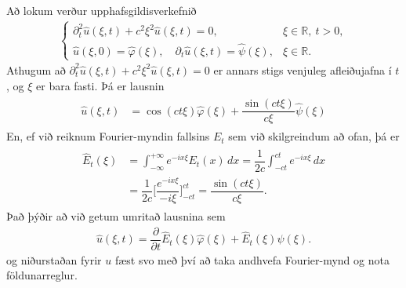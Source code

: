 \documentclass[a4paper,10pt,icelandic]{sphinxmanual}
\begin{document}
Að lokum verður upphafsgildisverkefnið
\begin{equation*}
\begin{split}\begin{cases}
{\partial}_t^2\widehat u({\xi},t)+c^2{\xi}^2
\widehat u({\xi},t)=0, &{\xi}\in {{\mathbb  R}},\ t>0,\\
\widehat u({\xi},0)=\widehat\varphi({\xi}), \quad {\partial}_t\widehat
u({\xi},t)=\widehat{\psi}({\xi}), &{\xi}\in {{\mathbb  R}}.
\end{cases}\end{split}
\end{equation*}
Athugum að \({\partial}_t^2\widehat u({\xi},t)+c^2{\xi}^2\widehat u({\xi},t)=0\) er annars stigs venjuleg afleiðujafna í \(t\), og \(\xi\) er bara fasti. Þá er lausnin
\begin{equation*}
\begin{split}\begin{aligned}
\widehat u({\xi},t)&=
\cos(ct{\xi})\widehat\varphi({\xi})
+\dfrac{\sin(ct{\xi})}{c{\xi}}\widehat{\psi}({\xi})
\end{aligned}\end{split}
\end{equation*}
En, ef við reiknum Fourier-myndin fallsins \(E_t\) sem við skilgreindum að ofan, þá er
\begin{equation*}
\begin{split}\begin{aligned}
\widehat E_t(\xi)&=\int_{-\infty}^{+\infty}e^{-ix\xi}E_t(x)\, dx
=\dfrac 1{2c}\int_{-ct}^{ct}e^{-ix\xi}\, dx\\
 &=\dfrac 1{2c}\bigg[\dfrac{e^{-ix\xi}}{-i\xi}\bigg]_{-ct}^{ct}
=\dfrac{\sin(ct\xi)}{c\xi}.\end{aligned}\end{split}
\end{equation*}
Það þýðir að við getum umritað lausnina sem
\begin{equation*}
\begin{split}\widehat u({\xi},t)=\dfrac{\partial}{\partial t}\widehat E_t({\xi})\widehat\varphi({\xi})+\widehat E_t({\xi})\widehat {\psi}({\xi}).\end{split}
\end{equation*}
og niðurstaðan fyrir \(u\) fæst svo með því að taka andhvefa Fourier-mynd og nota földunarreglur.

\end{document}
